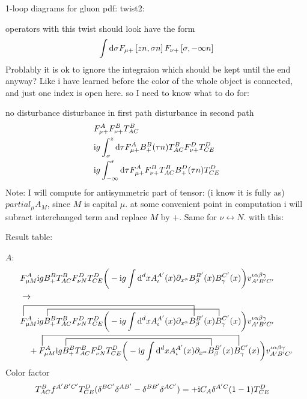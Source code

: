 \ifdefined\mainprogram{}
\else

\fi

1-loop diagrams for gluon pdf: twist2:

operators with this twist should look have the form
\begin{align}
	\int \text{d} \sigma F_{\mu+} \left[zn,\sigma n \right] F_{\nu +} \left[\sigma ,-\infty n \right]
\end{align}
Problably it is ok to ignore the integraion which should be kept until the end anyway? 
Like i have learned before the color of the whole object is connected, and just one index is open here. 
so I need to know what to do for: 

no disturbance
disturbance in first path
disturbance in second path
\begin{align}
	&F_{\mu+}^{A}  F_{\nu +}^{B} T^{B}_{AC}
	\\
	&\text{i} g \int_{\sigma}^{z} \text{d} \tau F_{\mu+}^{A} B_+^B(\tau n) T^B_{AC}  F_{\nu +}^{D}T^D_{CE}
	\\
	&\text{i} g \int_{-\infty}^{\sigma} \text{d} \tau F_{\mu+}^{A} F_{\nu +}^{B}T^{B}_{AC} B_+^D(\tau n) T^D_{CE}
\end{align}
Note: I will compute for antisymmetric part of tensor: (i know it is fully as) $partial_\mu A_M$, since $M$ is capital $\mu$. at some convenient point in computation i will subract interchanged term and replace $M$ by $+$.  Same for $\nu \leftrightarrow N$.
with this:


Result table:



$A$:
\begin{align}
	&\ft_{\mu M}^{A} \imag g B_+^B  T^B_{AC} \ft _{\nu N}^D T^D_{CE}\bigg(-\imag g \int \ddx xA_\iota^{A'}(x) \partial_{x^\alpha} B_\beta^{B'} (x) B_\gamma^{C'}(x) \bigg) v^{\iota \alpha\beta\gamma}_{A'B'C'}
	\\
	&\rightarrow
	\\
	\contraction[3ex]{}{\ft}{_{\mu M}^{A} \imag g B_+^B  T^B_{AC} \ft _{\nu N}^D T^D_{CE}\bigg(-\imag g \int \ddx xA_\iota^{A'}(x) \partial_{x^\alpha}}{B}
	\contraction[2ex]{\ft_{\mu M}^{A} \imag g}{B}{_+^B  T^B_{AC} \ft _{\nu N}^D T^D_{CE}\bigg(-\imag g \int \ddx xA_\iota^{A'}(x) \partial_{x^\alpha} B_\beta^{B'} (x)}{B}
	&\ft_{\mu M}^{A} \imag g B_+^B  T^B_{AC} \ft _{\nu N}^D T^D_{CE}\bigg(-\imag g \int \ddx xA_\iota^{A'}(x) \partial_{x^\alpha} B_\beta^{B'} (x) B_\gamma^{C'}(x) \bigg) v^{\iota \alpha\beta\gamma}_{A'B'C'}
	\nl
	+
	\contraction[3ex]{}{\ft}{_{\mu M}^{A} \imag g B_+^B  T^B_{AC} \ft _{\nu N}^D T^D_{CE}\bigg(-\imag g \int \ddx xA_\iota^{A'}(x) \partial_{x^\alpha} B_\beta^{B'} (x)}{B}
	\contraction[2ex]{\ft_{\mu M}^{A} \imag g}{B}{_+^B  T^B_{AC} \ft _{\nu N}^D T^D_{CE}\bigg(-\imag g \int \ddx xA_\iota^{A'}(x) \partial_{x^\alpha}}{B}
	\ft_{\mu M}^{A} \imag g B_+^B  T^B_{AC} \ft _{\nu N}^D T^D_{CE}\bigg(-\imag g \int \ddx xA_\iota^{A'}(x) \partial_{x^\alpha} B_\beta^{B'} (x) B_\gamma^{C'}(x) \bigg) v^{\iota \alpha\beta\gamma}_{A'B'C'}	
\end{align}
Color factor
\begin{align}
	T^{B}_{AC} f^{A'B'C'} T^D_{CE} (\delta^{BC'}\delta^{AB'} - \delta^{BB'} \delta^{AC'}) &= +\text{i} C_A \delta^{A'C} (1-1) T^D_{CE}
\end{align}

